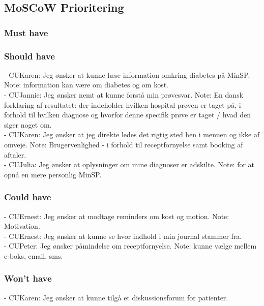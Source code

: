 \subsection{MoSCoW Prioritering}
\subsubsection*{Must have}
\subsubsection*{Should have}
%
- CUKaren: Jeg ønsker at kunne læse information omkring diabetes på MinSP. Note: information kan være om diabetes og om kost.\\ %
- CUJannie: Jeg ønsker nemt at kunne forstå min prøvesvar. Note: En dansk forklaring af resultatet: der indeholder hvilken hospital prøven er taget på, i forhold til hvilken diagnose og hvorfor denne specifik prøve er taget / hvad den siger noget om.\\ %
- CUKaren: Jeg ønsker at jeg direkte ledes det rigtig sted hen i menuen og ikke af omveje. Note: Brugervenlighed - i forhold til receptfornyelse samt booking af aftaler.\\ 
- CUJulia: Jeg ønsker at oplysninger om mine diagnoser er adskilte. Note: for at opnå en mere personlig MinSP.\\
\subsubsection*{Could have}
- CUErnest: Jeg ønsker at modtage reminders om kost og motion. Note: Motivation. \\
- CUErnest: Jeg ønsker at kunne se hvor indhold i min journal stammer fra.\\
- CUPeter: Jeg ønsker påmindelse om receptfornyelse. Note: kunne vælge mellem e-boks, email, sms.\\
\subsubsection*{Won't have}
- CUKaren: Jeg ønsker at kunne tilgå et diskussionsforum for patienter.\\ %